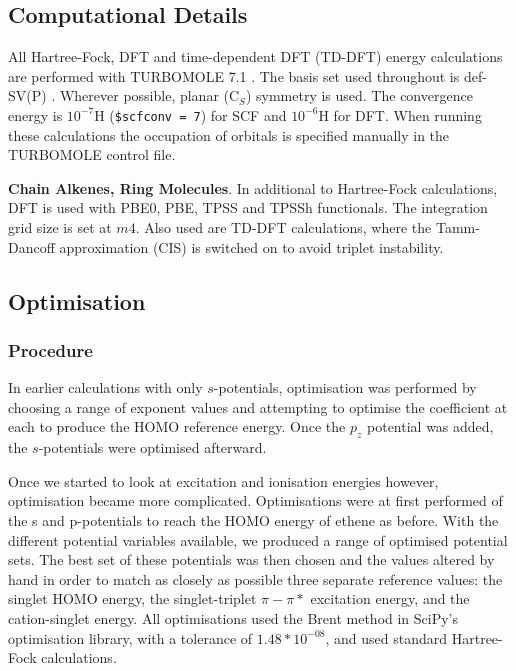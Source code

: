 \documentclass[12pt]{article}
\begin{document}
\subsection*{\sffamily \large Computational Details}

All Hartree-Fock, DFT and time-dependent DFT (TD-DFT) energy calculations are performed with TURBOMOLE 7.1 \cite{TURBOMOLE}. The basis set used throughout is def-SV(P) \cite{defsvp}. Wherever possible, planar (C\(_{S}\)) symmetry is used. The convergence energy is \(10^{-7}\)H (\texttt{\$scfconv = 7}) for SCF and \(10^{-6}\)H for DFT. When running these calculations the occupation of orbitals is specified manually in the TURBOMOLE control file.

\textbf{Chain Alkenes, Ring Molecules}. In additional to Hartree-Fock calculations, DFT is used with PBE0, PBE, TPSS and TPSSh functionals. \cite{pbe0,pbe,tpss,tpssh} The integration grid size is set at \(m4\). Also used are TD-DFT calculations, where the Tamm-Dancoff approximation (CIS) \cite{tammdancoff} is switched on to avoid triplet instability.

\subsection*{\sffamily \large Optimisation}

\subsubsection*{Procedure}
In earlier calculations with only \(s\)-potentials, optimisation was performed by choosing a range of exponent values and attempting to optimise the coefficient at each to produce the HOMO reference energy. Once the \(p_{z}\) potential was added, the \(s\)-potentials were optimised afterward. 

Once we started to look at excitation and ionisation energies however, optimisation became more complicated. Optimisations were at first performed of the s and p-potentials to reach the HOMO energy of ethene as before. With the different potential variables available, we produced a range of optimised potential sets. The best set of these potentials was then chosen and the values altered by hand in order to match as closely as possible three separate reference values: the singlet HOMO energy, the singlet-triplet \(\pi-\pi*\) excitation energy, and the cation-singlet energy. All optimisations used the Brent method in SciPy's optimisation library, with a tolerance of \(1.48*10^{-08}\), and used standard Hartree-Fock calculations.\cite{scipy}
\end{document}
